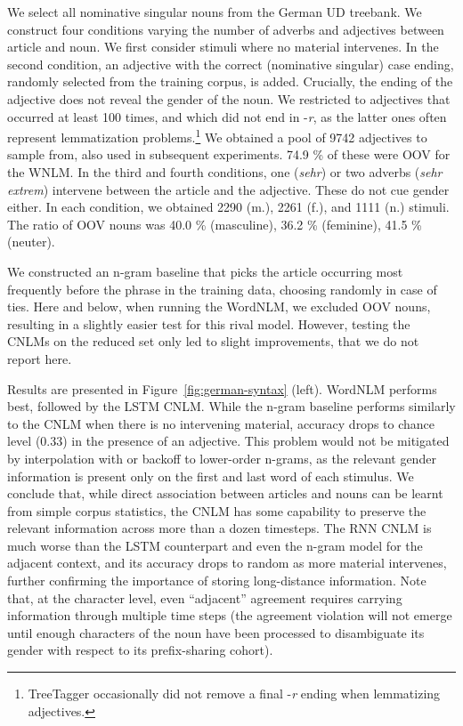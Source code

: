 We select all nominative singular nouns from the German UD treebank. %
We construct four conditions varying the number of adverbs and adjectives between  article and noun.
We first consider stimuli where no material intervenes. %
In the second condition, an adjective with the correct (nominative singular) case ending, randomly selected from the training corpus, is added. Crucially, the ending of the adjective does not reveal the gender of the noun.
We restricted to adjectives that occurred at least 100 times, and which did not end in -\emph{r}, as the latter ones often represent lemmatization problems.\footnote{TreeTagger occasionally did not remove a final -\emph{r} ending when lemmatizing adjectives.}
We obtained a pool of 9742 adjectives to sample from, also used in subsequent experiments.
74.9 \% of these were OOV for the WNLM.
In the third and fourth conditions, one (\emph{sehr}) or two adverbs (\emph{sehr extrem}) intervene between the article and the adjective. These do not cue gender either. In each condition, we obtained 2290 (m.), 2261 (f.), and 1111 (n.) stimuli.
The ratio of OOV nouns was 40.0 \% (masculine), 36.2 \% (feminine), 41.5 \% (neuter).

We constructed an n-gram baseline that picks the article occurring
most frequently before the phrase in the training data, choosing
randomly in case of ties. Here and below, when running the
WordNLM, we excluded OOV nouns, resulting in a slightly easier test
for this rival model. However, testing the CNLMs on the reduced set
only led to slight improvements, that we do not report here.

Results are presented in Figure~\ref{fig:german-syntax}
(left). WordNLM performs best, followed by the LSTM CNLM.  While the
n-gram baseline performs similarly to the CNLM when there is no
intervening material, accuracy drops to chance level (0.33) in the
presence of an adjective. This problem would not be mitigated by
interpolation with or backoff to lower-order n-grams, as the relevant
gender information is present only on the first and last word of each
stimulus. We conclude that, while direct association between articles
and nouns can be learnt from simple corpus statistics, the CNLM has
some capability to preserve the relevant information across more than
a dozen timesteps. The RNN CNLM is much worse than the LSTM
counterpart and even the n-gram model for the adjacent context, and
its accuracy drops to random as more material intervenes, further
confirming the importance of storing long-distance information. Note
that, at the character level, even ``adjacent'' agreement requires
carrying information through multiple time steps (the agreement
violation will not emerge until enough characters of the noun have
been processed to disambiguate its gender with respect to its
prefix-sharing cohort).

